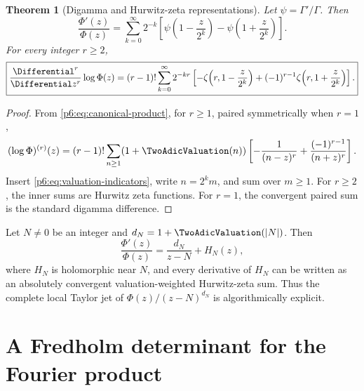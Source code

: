 \documentclass[11pt]{article}
\newtheorem{theorem}{Theorem}[section]
\theoremstyle{definition}
\theoremstyle{remark}
\begin{document}
\begin{theorem}[Digamma and Hurwitz-zeta representations]\label{p6:thm:hurwitz}
Let \(\psi=\Gamma'/\Gamma\).  Then
\begin{equation}
 \boxed{
 \frac{\Phi'(z)}{\Phi(z)}
 =\sum_{k=0}^{\infty}2^{-k}
 \left[
 \psi\!\left(1-\frac{z}{2^k}\right)
 -\psi\!\left(1+\frac{z}{2^k}\right)
 \right].
 }                                                           \label{p6:eq:logder-digamma}
\end{equation}
For every integer \(r\ge2\),
\begin{equation}
 \boxed{
 \frac{\Differential^r}{\Differential z^r}\log\Phi(z)
 =(r-1)!\sum_{k=0}^{\infty}2^{-kr}
 \left[
 -\zeta\!\left(r,1-\frac{z}{2^k}\right)
 +(-1)^{r-1}\zeta\!\left(r,1+\frac{z}{2^k}\right)
 \right].
 }                                                           \label{p6:eq:logder-hurwitz}
\end{equation}
\end{theorem}

\begin{proof}
From \eqref{p6:eq:canonical-product}, for \(r\ge1\), paired symmetrically when \(r=1\),
\begin{equation}
 (\log\Phi)^{(r)}(z)
 =(r-1)!\sum_{n\ge1}(1+\TwoAdicValuation(n))
 \left[-\frac1{(n-z)^r}+\frac{(-1)^{r-1}}{(n+z)^r}\right].   \label{p6:eq:logder-general-zero}
\end{equation}
Insert \eqref{p6:eq:valuation-indicators}, write \(n=2^k m\), and sum over \(m\ge1\).
For \(r\ge2\), the inner sums are Hurwitz zeta functions.  For \(r=1\), the convergent
paired sum is the standard digamma difference.
\end{proof}

\begin{corollary}
Let \(N\ne0\) be an integer and \(d_N=1+\TwoAdicValuation(|N|)\).  Then
\begin{equation}
 \frac{\Phi'(z)}{\Phi(z)}=\frac{d_N}{z-N}+H_N(z),             \label{p6:eq:local-logder-zero}
\end{equation}
where \(H_N\) is holomorphic near \(N\), and every derivative of \(H_N\) can be written
as an absolutely convergent valuation-weighted Hurwitz-zeta sum.  Thus the complete local
Taylor jet of \(\Phi(z)/(z-N)^{d_N}\) is algorithmically explicit.
\end{corollary}

\section{A Fredholm determinant for the Fourier product}\label{p6:sec:fredholm}
\end{document}
